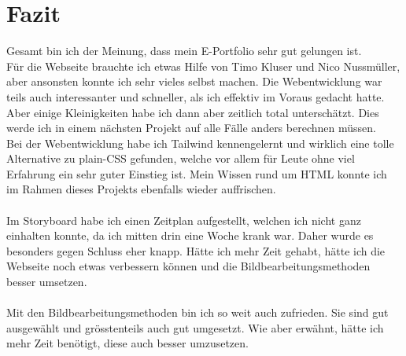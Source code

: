 \documentclass[11pt]{article}
\begin{document}
    \section{Fazit}
    Gesamt bin ich der Meinung, dass mein E-Portfolio sehr gut gelungen ist.\\
    Für die Webseite brauchte ich etwas Hilfe von Timo Kluser und Nico Nussmüller, aber ansonsten konnte ich sehr vieles selbst machen. Die
    Webentwicklung war teils auch interessanter und schneller, als ich effektiv im Voraus gedacht hatte. Aber einige Kleinigkeiten habe
    ich dann aber zeitlich total unterschätzt. Dies werde ich in einem nächsten Projekt auf alle Fälle anders berechnen müssen.\\
    Bei der Webentwicklung habe ich Tailwind kennengelernt und wirklich eine tolle Alternative zu plain-CSS gefunden, welche vor allem für
    Leute ohne viel Erfahrung ein sehr guter Einstieg ist. Mein Wissen rund um HTML konnte ich im Rahmen dieses Projekts ebenfalls wieder
    auffrischen.\\ \\
    Im Storyboard habe ich einen Zeitplan aufgestellt, welchen ich nicht ganz einhalten konnte, da ich mitten drin eine Woche krank war. Daher
    wurde es besonders gegen Schluss eher knapp. Hätte ich mehr Zeit gehabt, hätte ich die Webseite noch etwas verbessern können und die
    Bildbearbeitungsmethoden besser umsetzen.\\ \\
    Mit den Bildbearbeitungsmethoden bin ich so weit auch zufrieden. Sie sind gut ausgewählt und grösstenteils auch gut umgesetzt. Wie aber
    erwähnt, hätte ich mehr Zeit benötigt, diese auch besser umzusetzen.
\end{document}

